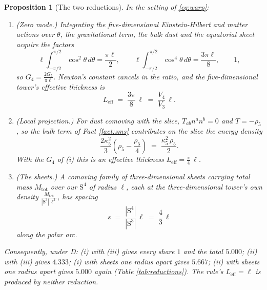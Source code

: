 \documentclass[11pt]{article}
\newtheorem{proposition}[theorem]{Proposition}
\theoremstyle{definition}
\newcommand{\Sph}{\mathrm{S}}
\begin{document}
\begin{proposition}[The two reductions]\label{prop:reduction}
In the setting of \eqref{eq:warp}:
\begin{enumerate}
\item[(i)] (Zero mode.) Integrating the five-dimensional Einstein-Hilbert and matter actions over $\theta$, the gravitational term, the bulk dust and the equatorial sheet acquire the factors
\[
\ell\int_{-\pi/2}^{\pi/2}\cos^{2}\theta\,d\theta = \frac{\pi\ell}{2}, \qquad
\ell\int_{-\pi/2}^{\pi/2}\cos^{4}\theta\,d\theta = \frac{3\pi\ell}{8}, \qquad 1,
\]
so $G_{4} = \frac{2G_{5}}{\pi\ell}$. Newton's constant cancels in the ratio, and the five-dimensional tower's effective thickness is
\[
L_{\mathrm{eff}} \;=\; \frac{3\pi}{8}\,\ell \;=\; \frac{V_{4}}{V_{3}}\,\ell .
\]
\item[(ii)] (Local projection.) For dust comoving with the slice, $T_{ab}n^{a}n^{b} = 0$ and $T = -\rho_{5}$, so the bulk term of Fact \ref{fact:sms} contributes on the slice the energy density
\[
\frac{2\kappa_{5}^{2}}{3}\left(\rho_{5} - \frac{\rho_{5}}{4}\right) \;=\; \frac{\kappa_{5}^{2}\,\rho_{5}}{2} .
\]
With the $G_{4}$ of (i) this is an effective thickness $L_{\mathrm{eff}} = \frac{\pi}{4}\,\ell$.
\item[(iii)] (The sheets.) A comoving family of three-dimensional sheets carrying total mass $M_{\mathrm{tot}}$ over our $\Sph^{4}$ of radius $\ell$, each at the three-dimensional tower's own density $\frac{M_{\mathrm{tot}}}{|\Sph^{3}|\,\ell^{3}}$, has spacing
\[
s \;=\; \frac{|\Sph^{4}|}{|\Sph^{3}|}\,\ell \;=\; \frac{4}{3}\,\ell
\]
along the polar arc.
\end{enumerate}
Consequently, under D: (i) with (iii) gives every share $1$ and the total $5.000$; (ii) with (iii) gives $4.333$; (i) with sheets one radius apart gives $5.667$; (ii) with sheets one radius apart gives $5.000$ again (Table \ref{tab:reductions}). The rule's $L_{\mathrm{eff}} = \ell$ is produced by neither reduction.
\end{proposition}
\end{document}
